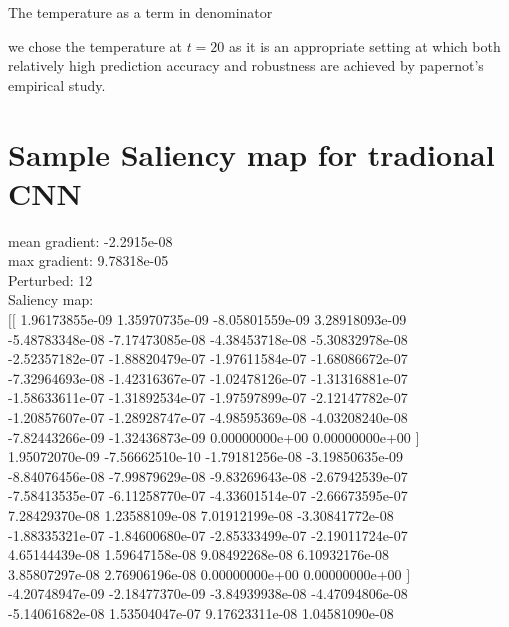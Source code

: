 \documentclass{article}
\begin{document}
The temperature as a term in denominator 


we chose the temperature at $t=20$ as it is an appropriate setting at which both relatively high prediction accuracy and robustness are achieved by papernot's empirical study\cite{Papernot}.

\newpage
\appendix
\section{Sample Saliency map for tradional CNN}
mean gradient: -2.2915e-08\\
max gradient: 9.78318e-05\\
Perturbed: 12\\
Saliency map:\\
$[[$  1.96173855e-09   1.35970735e-09  -8.05801559e-09   3.28918093e-09 \\
   -5.48783348e-08  -7.17473085e-08  -4.38453718e-08  -5.30832978e-08 \\
   -2.52357182e-07  -1.88820479e-07  -1.97611584e-07  -1.68086672e-07 \\
   -7.32964693e-08  -1.42316367e-07  -1.02478126e-07  -1.31316881e-07 \\
   -1.58633611e-07  -1.31892534e-07  -1.97597899e-07  -2.12147782e-07 \\
   -1.20857607e-07  -1.28928747e-07  -4.98595369e-08  -4.03208240e-08 \\
   -7.82443266e-09  -1.32436873e-09   0.00000000e+00   0.00000000e+00 $]$ \\
    1.95072070e-09  -7.56662510e-10  -1.79181256e-08  -3.19850635e-09 \\
   -8.84076456e-08  -7.99879629e-08  -9.83269643e-08  -2.67942539e-07 \\
   -7.58413535e-07  -6.11258770e-07  -4.33601514e-07  -2.66673595e-07 \\
    7.28429370e-08   1.23588109e-08   7.01912199e-08  -3.30841772e-08 \\
   -1.88335321e-07  -1.84600680e-07  -2.85333499e-07  -2.19011724e-07 \\
    4.65144439e-08   1.59647158e-08   9.08492268e-08   6.10932176e-08 \\
	3.85807297e-08   2.76906196e-08   0.00000000e+00   0.00000000e+00 $]$ \\
   -4.20748947e-09  -2.18477370e-09  -3.84939938e-08  -4.47094806e-08 \\
   -5.14061682e-08   1.53504047e-07   9.17623311e-08   1.04581090e-08 \\
\end{document}
